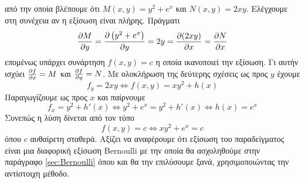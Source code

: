 \documentclass[11pt,a4paper,twoside]{book}
\newcommand{\eng}[1]{\selectlanguage{english}#1\selectlanguage{greek}}
\begin{document}
από την οποία βλέπουμε ότι $M(x,y)=y^2+e^x$ και $N(x,y)=2xy$. Ελέγχουμε στη συνέχεια αν η εξίσωση είναι πλήρης. Πράγματι
\[ \diffp{M}{y}=\diffp{\left(y^2+e^x\right)}{y}=2y=\diffp{(2xy)}{x}=\diffp{N}{x} \]
επομένως υπάρχει συνάρτηση $f(x,y)=c$ η οποία ικανοποιεί την εξίσωση. Γι αυτήν ισχύει $\diffp{f}{x}=M$ και $\diffp{f}{y}=N$. Με ολοκλήρωση της δεύτερης σχέσεις ως προς $y$ έχουμε
\[ f_y=2xy\Leftrightarrow f(x,y)=xy^2+h(x) \]
Παραγωγίζουμε ως προς $x$ και παίρνουμε
\[ f_x=y^2+h'(x)\Leftrightarrow y^2+e^x=y^2+h'(x)\Leftrightarrow h(x)=e^x \]
Συνεπώς η λύση δίνεται από τον τύπο
\[ f(x,y)=c\Leftrightarrow xy^2+e^x=c \]
όπου $c$ αυθαίρετη σταθερά. Αξίζει να αναφέρουμε ότι εξίσωση του παραδείγματος είναι μια διαφορική εξίσωση \eng{Bernoulli} με την οποία θα ασχοληθούμε στην παράγραφο \ref{sec:Bernoulli} όπου και θα την επιλύσουμε ξανά, χρησιμοποιώντας την αντίστοιχη μέθοδο.
\end{document}
